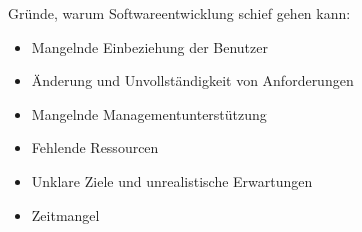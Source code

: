 \documentclass{panikzettel}
\begin{document}
Gründe, warum Softwareentwicklung schief gehen kann:
\begin{itemize}
\item Mangelnde Einbeziehung der Benutzer
\item Änderung und Unvollständigkeit von Anforderungen
\item Mangelnde Managementunterstützung
\item Fehlende Ressourcen
\item Unklare Ziele und unrealistische Erwartungen
\item Zeitmangel
\end{itemize}
\end{document}
